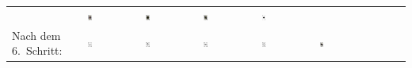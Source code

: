 \begin{tabular}{m{30mm}m{11mm}m{11mm}m{11mm}m{11mm}m{11mm}m{11mm}m{11mm}m{11mm}}
&
\includegraphics[width=0.08\textwidth]{./inf/SEKII/19_Java_Sortierverfahren/PikBube.png}
&
\includegraphics[width=0.08\textwidth]{./inf/SEKII/19_Java_Sortierverfahren/PikDame.png}
&
\includegraphics[width=0.08\textwidth]{./inf/SEKII/19_Java_Sortierverfahren/PikKoenig.png}
&
\includegraphics[width=0.08\textwidth]{./inf/SEKII/19_Java_Sortierverfahren/PikAs.png}
\\
Nach dem 6.\ Schritt: &
\includegraphics[width=0.08\textwidth]{./inf/SEKII/19_Java_Sortierverfahren/Pik7.png}
&
\includegraphics[width=0.08\textwidth]{./inf/SEKII/19_Java_Sortierverfahren/Pik8.png}
&
\includegraphics[width=0.08\textwidth]{./inf/SEKII/19_Java_Sortierverfahren/Pik9.png}
&
\includegraphics[width=0.08\textwidth]{./inf/SEKII/19_Java_Sortierverfahren/Pik10.png}
&
\includegraphics[width=0.08\textwidth]{./inf/SEKII/19_Java_Sortierverfahren/PikBube.png}

\end{tabular}
